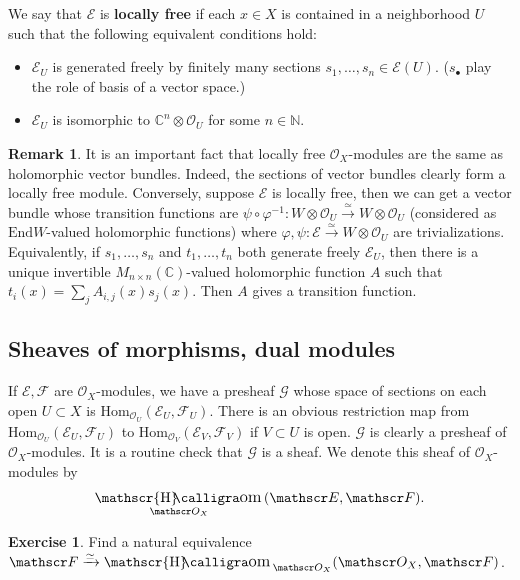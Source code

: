 \documentclass[11pt,b5paper,notitlepage]{article}
\theoremstyle{definition}
\newtheorem{exe}[df]{Exercise}
\newtheorem{rem}[df]{Remark}
\theoremstyle{plain}
\DeclareMathOperator{\shom}{\mathscr{H}\text{\kern -3pt {\calligra\large om}}\,}
\newcommand{\End}{\mathrm{End}} %
\newcommand{\Hom}{\mathrm{Hom}}
\newcommand{\scr}{\mathscr}
\newcommand{\blt}{\bullet}
\newcommand{\Cbb}{\mathbb C}
\newcommand{\Nbb}{\mathbb N}
\numberwithin{equation}{section}
\begin{document}
We say that $\scr E$ is \textbf{locally free} if each $x\in X$ is contained in a neighborhood $U$ such that the following equivalent conditions hold:
\begin{itemize}
	\item $\scr E_U$ is generated freely by finitely many sections $s_1,\dots,s_n\in\scr E(U)$. ($s_\blt$ play the role of basis of a vector space.)
	\item $\scr E_U$ is isomorphic to $\Cbb^n\otimes\scr O_U$ for some $n\in\Nbb$. 
\end{itemize}








\begin{rem}\label{lba105}
	It is an important fact that locally free $\scr O_X$-modules are the same as holomorphic vector bundles. Indeed, the sections of vector bundles clearly form a locally free module. Conversely, suppose $\scr E$ is locally free, then we can get a vector bundle whose transition functions are $\psi\circ\varphi^{-1}:W\otimes\scr O_U\xrightarrow{\simeq}W\otimes\scr O_U$ (considered as $\End W$-valued holomorphic functions) where $\varphi,\psi:\scr E\xrightarrow{\simeq} W\otimes\scr O_U$ are trivializations. Equivalently, if $s_1,\dots,s_n$ and $t_1,\dots,t_n$ both generate freely $\scr E_U$, then there is a unique invertible $M_{n\times n}(\Cbb)$-valued holomorphic function $A$ such that $t_i(x)=\sum_j A_{i,j}(x)s_j(x)$. Then $A$ gives a transition function.
\end{rem}


\subsection{Sheaves of morphisms, dual modules}


If $\scr E,\scr F$ are $\scr O_X$-modules, we have a presheaf $\scr G$ whose space of sections on each open $U\subset X$ is $\Hom_{\scr O_U}(\scr E_U,\scr F_U)$. There is an obvious restriction map from $\Hom_{\scr O_U}(\scr E_U,\scr F_U)$ to $\Hom_{\scr O_V}(\scr E_V,\scr F_V)$ if $V\subset U$ is open. $\scr G$ is clearly a presheaf of $\scr O_X$-modules. It is a routine check that $\scr G$ is a sheaf. We denote this sheaf of $\scr O_X$-modules by
\begin{align*}
	\shom_{\scr O_X}(\scr E,\scr F).	
\end{align*}

\begin{exe}
	Find a natural equivalence $\scr F\xrightarrow{\simeq}\shom_{\scr O_X}(\scr O_X,\scr F)$.
\end{exe}
\end{document}
